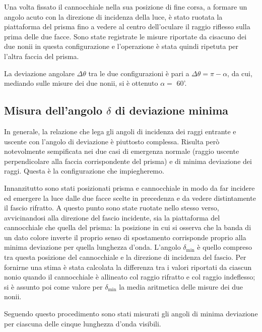 \documentclass[italian,a4paper]{article}
\begin{document}
Una volta fissato il cannocchiale nella sua posizione di fine corsa, a formare un angolo acuto con la direzione di incidenza della luce, è stato ruotata la piattaforma del prisma fino a vedere al centro dell'oculare il raggio riflesso sulla prima delle due facce. Sono state registrate le misure riportate da cisacuno dei due nonii in questa configurazione e l'operazione è stata quindi ripetuta per l'altra faccia del prisma.

La deviazione angolare $\Delta \theta$ tra le due configurazioni è pari a $\Delta\theta=\pi-\alpha$, da cui, mediando sulle misure dei due nonii, si è ottenuto $\alpha=$ 60'.
\subsection*{Misura dell'angolo $\delta$ di deviazione minima}
In generale, la relazione che lega gli angoli di incidenza dei raggi
entrante e uscente con l'angolo di deviazione è piuttosto complessa. Risulta
però notevolmente sempificata nei due casi di emergenza normale (raggio
uscente perpendicolare alla faccia corrispondente del prisma) e di minima
deviazione dei raggi. Questa è la configurazione che impiegheremo.

Innanzitutto sono stati posizionati prisma e cannocchiale in modo da far incidere ed emergere la luce dalle due facce scelte in precedenza e da vedere distintamente il fascio rifratto. A questo punto sono state ruotate nello stesso verso, avvicinandosi alla direzione del fascio incidente, sia la piattaforma del cannocchiale che quella del prisma: la posizione in cui si osserva che la banda di un dato colore inverte il proprio senso di spostamento corrisponde proprio alla minima deviazione per quella lunghezza d'onda. L'angolo $\delta_{\min}$ è quello compreso tra questa posizione del cannocchiale e la direzione di incidenza del fascio. Per fornirne una stima è stata calcolata la differenza tra i valori riportati da ciascun nonio quando il cannocchiale è allineato col raggio rifratto e col raggio indeflesso; si è assunto poi come valore per $\delta_{\min}$ la media aritmetica delle misure dei due nonii.

Seguendo questo procedimento sono stati misurati gli angoli di minima deviazione per ciascuna delle cinque lunghezza d'onda visibili.
\end{document}

